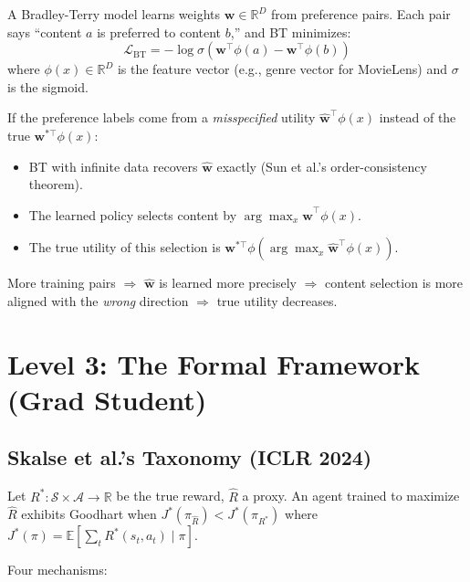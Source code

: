 \documentclass[11pt]{article}
\begin{document}
A Bradley-Terry model learns weights $\mathbf{w} \in \mathbb{R}^D$ from
preference pairs. Each pair says ``content $a$ is preferred to content
$b$,'' and BT minimizes:
\begin{equation}
  \mathcal{L}_{\text{BT}} = -\log \sigma\!\left(
    \mathbf{w}^\top \phi(a) - \mathbf{w}^\top \phi(b)
  \right)
\end{equation}
where $\phi(x) \in \mathbb{R}^D$ is the feature vector (e.g., genre
vector for MovieLens) and $\sigma$ is the sigmoid.

If the preference labels come from a \emph{misspecified} utility
$\hat{\mathbf{w}}^\top \phi(x)$ instead of the true
$\mathbf{w}^{*\top} \phi(x)$:
\begin{itemize}
  \item BT with infinite data recovers $\hat{\mathbf{w}}$ exactly
    (Sun et al.'s order-consistency theorem).
  \item The learned policy selects content by
    $\arg\max_x \hat{\mathbf{w}}^\top \phi(x)$.
  \item The true utility of this selection is
    $\mathbf{w}^{*\top} \phi(\arg\max_x \hat{\mathbf{w}}^\top
    \phi(x))$.
\end{itemize}

More training pairs $\Rightarrow$ $\hat{\mathbf{w}}$ is learned more
precisely $\Rightarrow$ content selection is more aligned with the
\emph{wrong} direction $\Rightarrow$ true utility decreases.

\section{Level 3: The Formal Framework (Grad Student)}

\subsection{Skalse et al.'s Taxonomy (ICLR 2024)}

Let $R^*: \mathcal{S} \times \mathcal{A} \to \mathbb{R}$ be the true
reward, $\hat{R}$ a proxy. An agent trained to maximize $\hat{R}$
exhibits Goodhart when
$J^*(\pi_{\hat{R}}) < J^*(\pi_{R^*})$
where $J^*(\pi) = \mathbb{E}[\sum_t R^*(s_t, a_t) \mid \pi]$.

Four mechanisms:
\end{document}
